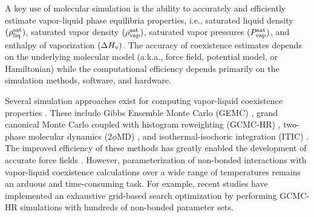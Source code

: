 \documentclass[journal=jced,manuscript=article]{achemso}
\begin{document}
A key use of molecular simulation is the ability to accurately and efficiently estimate vapor-liquid phase equilibria properties, i.e., saturated liquid density $(\rho_{\rm liq}^{\rm sat})$, saturated vapor density $(\rho_{\rm vap}^{\rm sat})$, saturated vapor pressures $(P_{\rm vap}^{\rm sat})$, and enthalpy of vaporization $(\Delta H_{\rm v})$. The accuracy of coexistence estimates depends on the underlying molecular model (a.k.a., force field, potential model, or Hamiltonian) while the computational efficiency depends primarily on the simulation methods, software, and hardware.

Several simulation approaches exist for computing vapor-liquid coexistence properties \cite{Pana2000}. These include Gibbs Ensemble Monte Carlo (GEMC) \cite{Pana2000,Stubbs2004}, grand canonical Monte Carlo coupled with histogram reweighting (GCMC-HR) \cite{Pana2000,Potoff1999,Stubbs2004}, two-phase molecular dynamics (2$\phi$MD) \cite{Fern2007}, and isothermal-isochoric integration (ITIC) \cite{Mostafa2018}. The improved efficiency of these methods has greatly enabled the development of accurate force fields \cite{TraPPE,TAMie,Mie,AUA4,Mess4}. However, parameterization of non-bonded interactions with vapor-liquid coexistence calculations over a wide range of temperatures remains an arduous and time-consuming task. For example, recent studies have implemented an exhaustive grid-based search optimization by performing GCMC-HR simulations with hundreds of non-bonded parameter sets. \cite{Mick_Mie,Potoff_branched,Barhaghi2017}


\end{document}
